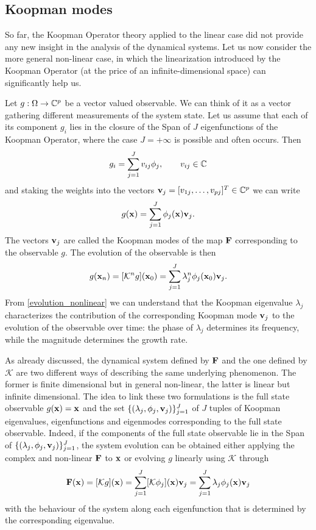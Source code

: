 \subsection{Koopman modes}
So far, the Koopman Operator theory applied to the linear case did not provide any new insight in the analysis of the dynamical systems. Let us now consider the more general non-linear case, in which the linearization introduced by the Koopman Operator (at the price of an infinite-dimensional space) can significantly help us.

Let $g:\Omega\to\mathbb{C}^p$ be a vector valued observable. We can think of it as a vector gathering different measurements of the system state. Let us assume that each of its component $g_i$ lies in the closure of the Span of $J$ eigenfunctions of the Koopman Operator, where the case $J=+\infty$ is possible and often occurs. Then 
\begin{equation*}
	g_i = \sum_{j = 1}^J v_{ij}\phi_j, \qquad v_{ij}\in\mathbb{C}
\end{equation*}
and staking the weights into the vectors $\vb{v}_j = [v_{1j},\dots,v_{pj}]^T\in\mathbb{C}^p$ we can write
\begin{equation}
	g(\vb{x}) = \sum_{j = 1}^J \phi_j(\vb{x})\vb{v}_{j}.
\end{equation}
The vectors $\vb{v}_j$ are called the Koopman modes of the map $\vb{F}$ corresponding to the observable $g$. The evolution of the observable is then
\begin{equation}
	\label{evolution_nonlinear}
	g(\vb{x}_n) = [\mathcal{K}^ng](\vb{x}_0) = \sum_{j = 1}^J \lambda_j^n\phi_j(\vb{x}_0)\vb{v}_{j}.
\end{equation}
From \eqref{evolution_nonlinear} we can understand that the Koopman eigenvalue $\lambda_j$ characterizes the contribution of the corresponding Koopman mode $\vb{v}_j$ to the evolution of the observable over time: the phase of $\lambda_j$ determines its frequency, while the magnitude determines the growth rate.

As already discussed, the dynamical system defined by $\vb{F}$ and the one defined by $\mathcal{K}$ are two different ways of describing the same underlying phenomenon. The former is finite dimensional but in general non-linear, the latter is linear but infinite dimensional. The idea to link these two formulations is the full state observable $g(\vb{x}) = \vb{x}$ and the set $\{(\lambda_j, \phi_j, \vb{v}_j)\}_{j = 1}^J$ of $J$ tuples of Koopman eigenvalues, eigenfunctions and eigenmodes corresponding to the full state observable. Indeed, if the components of the full state observable lie in the Span of $\{(\lambda_j, \phi_j, \vb{v}_j)\}_{j = 1}^J$, the system evolution can be obtained either applying the complex and non-linear $\vb{F}$ to $\vb{x}$ or evolving $g$ linearly using $\mathcal{K}$ through
\begin{equation*}
	\vb{F}(\vb{x}) = [\mathcal{K}g](\vb{x}) = \sum_{j = 1}^J [\mathcal{K}\phi_j](\vb{x})\vb{v}_j = \sum_{j = 1}^J \lambda_j\phi_j(\vb{x})\vb{v}_j
\end{equation*}
with the behaviour of the system along each eigenfunction that is determined by the corresponding eigenvalue.